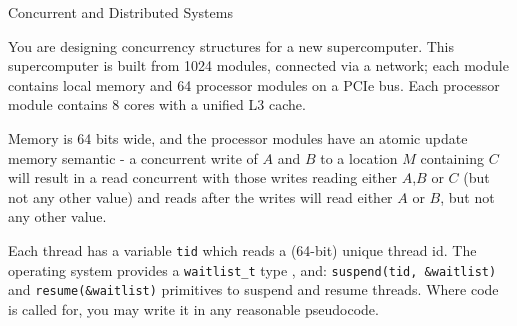 \documentclass{tripos}  %
\begin{document}
\begin{question}[MockIB,year=2024,paper=1,question=1,author=rrw]{Concurrent and Distributed Systems}


You are designing concurrency structures for a new supercomputer. This supercomputer is built from 1024 modules, connected via a network; each module contains local memory and 64 processor modules on a PCIe bus. Each processor module contains 8 cores with a unified L3 cache.

Memory is 64 bits wide, and the processor modules have an atomic update memory semantic - a concurrent write of $A$ and $B$ to a location $M$ containing $C$ will result in a read concurrent with those writes reading either $A$,$B$ or $C$ (but not any other value) and reads after the writes will read either $A$ or $B$, but not any other value.

Each thread has a variable \texttt{tid} which reads a (64-bit) unique thread id. The operating system provides a \texttt{waitlist\_t} type , and:
\texttt{suspend(tid, \&waitlist)} and \texttt{resume(\&waitlist)} primitives to suspend and resume threads. Where code is called for, you may write it in any reasonable pseudocode.


\end{question}
\end{document}
